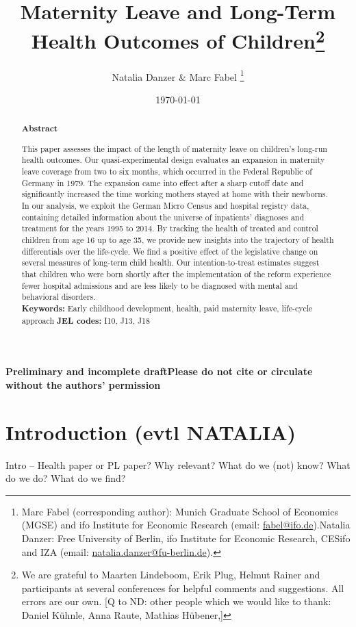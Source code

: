 \documentclass[11pt, a4paper]{article} %
\title{Maternity Leave and Long-Term Health Outcomes of Children\footnote{We are grateful to Maarten Lindeboom, Erik Plug, Helmut Rainer and participants at several conferences for helpful comments and suggestions. All errors are our own.
[Q to ND:  other people which we would like to thank: Daniel Kühnle, Anna Raute, Mathias Hübener,]}}
\author{Natalia Danzer \& Marc Fabel \thanks{Marc Fabel (corresponding author): Munich Graduate School of Economics (MGSE) and ifo Institute for Economic Research (email: \href{mailto:fabel@ifo.de}{fabel@ifo.de}).\newline Natalia Danzer: Free University of Berlin, ifo Institute for Economic Research, CESifo and IZA (email: \href{mailto:natalia.danzer@fu-berlin.de}{natalia.danzer@fu-berlin.de}).}}
\date{\monthyeardate\today}
\begin{document}
\setcounter{page}{0}  
\tableofcontents
\newpage
\setcounter{page}{1}    
\maketitle

\textbf{\color{red} Preliminary and incomplete draft\newline Please do not cite or circulate without the authors' permission}
\renewcommand{\abstractname}{\vspace{-\baselineskip}} %

  \begin{abstract}\noindent 
   \footnotesize{\begin{center}\textbf{Abstract}\end{center} This paper assesses the impact of the length of maternity leave on children’s long-run health outcomes. Our quasi-experimental design evaluates an expansion in maternity leave coverage from two to six months, which occurred in the Federal Republic of Germany in 1979. The expansion came into effect after a sharp cutoff date and significantly increased the time working mothers stayed at home with their newborns. In our analysis, we exploit the German Micro Census and hospital registry data, containing detailed information about the universe of inpatients' diagnoses and treatment for the years 1995 to 2014. By tracking the health of treated and control children from age 16 up to age 35, we provide new insights into the trajectory of health differentials over the life-cycle.
   	We find a positive effect of the legislative change on several measures of long-term child health. Our intention-to-treat estimates suggest that children who were born shortly after the implementation of the reform experience fewer hospital admissions and are less likely to be diagnosed with mental and behavioral disorders.\\\newline \textbf{Keywords:} Early childhood development, health, paid maternity leave, life-cycle approach \newline \textbf{JEL codes:} I10, J13, J18}
    \end{abstract}

\newpage


\section{Introduction (evtl NATALIA)}\label{sec:introduction}
Intro –
Health paper or PL paper?
Why relevant?
What do we (not) know?
What do we do?
What do we find?
 
\end{document}
